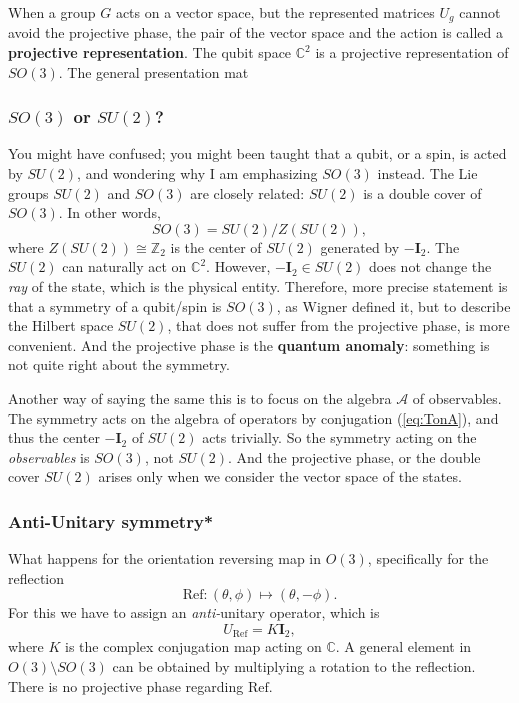 \documentclass[
]{scrartcl}
\numberwithin{equation}{section}
\theoremstyle{definition}
\theoremstyle{definition}
\theoremstyle{definition}
\theoremstyle{definition}
\theoremstyle{remark}
\begin{document}
When a group \(G\) acts on a vector space, but the represented matrices \(U_g\) cannot avoid the projective phase, the pair of the vector space and the action is called a \textbf{projective representation}.
The qubit space \(\mathbb{C}^2\) is a projective representation of \(SO(3)\).
The general presentation mat

\hypertarget{so3-or-su2}{%
\subsubsection{\texorpdfstring{\(SO(3)\) or \(SU(2)\)?}{SO(3) or SU(2)?}}\label{so3-or-su2}}

You might have confused; you might been taught that a qubit, or a spin, is acted by \(SU(2)\), and wondering why I am emphasizing \(SO(3)\) instead.
The Lie groups \(SU(2)\) and \(SO(3)\) are closely related: \(SU(2)\) is a double cover of \(SO(3)\).
In other words,
\begin{equation}
  \label{eq:SU2SO3}
  SO(3) = SU(2)/Z(SU(2)),
\end{equation}
where \(Z(SU(2))\cong \mathbb{Z}_2\) is the center of \(SU(2)\) generated by \(-\mathbf{I}_2\).
The \(SU(2)\) can naturally act on \(\mathbb{C}^2\).
However, \(-\mathbf{I}_2 \in SU(2)\) does not change the \emph{ray} of the state, which is the physical entity.
Therefore, more precise statement is that a symmetry of a qubit/spin is \(SO(3)\), as Wigner defined it,
but to describe the Hilbert space \(SU(2)\), that does not suffer from the projective phase, is more convenient.
And the projective phase is the \textbf{quantum anomaly}: something is not quite right about the symmetry.

Another way of saying the same this is to focus on the algebra \(\mathcal{A}\) of observables. The symmetry acts on the algebra of operators by conjugation (\eqref{eq:TonA}), and thus the center \(-\mathbf{I}_2\) of \(SU(2)\) acts trivially.
So the symmetry acting on the \emph{observables} is \(SO(3)\), not \(SU(2)\). And the projective phase, or the double cover \(SU(2)\) arises only when we consider the vector space of the states.

\hypertarget{anti-unitary-symmetry}{%
\subsubsection{Anti-Unitary symmetry*}\label{anti-unitary-symmetry}}

What happens for the orientation reversing map in \(O(3)\), specifically for the reflection
\begin{equation}
  \label{eq:reflection}
  \mathrm{Ref}: (\theta,\phi) \mapsto (\theta,-\phi).
\end{equation}
For this we have to assign an \emph{anti-}unitary operator, which is
\begin{equation}
  \label{eq:Uref}
  U_{\mathrm{Ref}} = K \mathbf{I}_2,
\end{equation}
where \(K\) is the complex conjugation map acting on \(\mathbb{C}\).
A general element in \(O(3)\setminus SO(3)\) can be obtained by multiplying a rotation to the reflection.
There is no projective phase regarding \(\mathrm{Ref}\).
\end{document}
